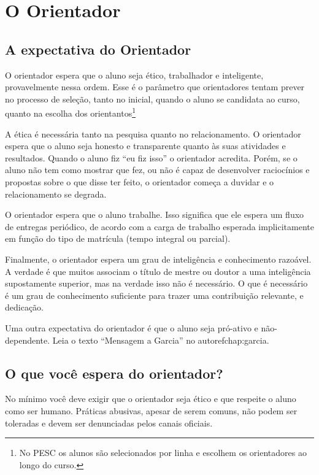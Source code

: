 \chapter{O Orientador}



\section{A expectativa do Orientador}

O orientador espera que o aluno seja ético, trabalhador e inteligente, provavelmente nessa ordem. Esse é o parâmetro que orientadores tentam prever no processo de seleção, tanto no inicial, quando o aluno se candidata ao curso, quanto na escolha dos orientantos\footnote{No PESC os alunos são selecionados por linha e escolhem os orientadores ao longo do curso.}

A ética é necessária tanto na pesquisa quanto no relacionamento. O orientador espera que o aluno seja honesto e transparente quanto às suas atividades e resultados. Quando o aluno fiz ``eu fiz isso'' o orientador acredita. Porém, se o aluno não tem como mostrar que fez, ou não é capaz de desenvolver raciocínios e propostas sobre o que disse ter feito, o orientador começa a duvidar e o relacionamento se degrada.

O orientador espera que o aluno trabalhe. Isso significa que ele espera um fluxo de entregas periódico, de acordo com a carga de trabalho esperada implicitamente em função do tipo de matrícula (tempo integral ou parcial). 

Finalmente, o orientador espera um grau de inteligência e conhecimento razoável. A verdade é que muitos associam o título de mestre ou doutor a uma inteligência  supostamente superior, mas na verdade isso não é necessário. O que é necessário é um grau de conhecimento suficiente para trazer uma contribuição relevante, e dedicação. 

Uma outra expectativa do orientador é que o aluno seja pró-ativo e não-dependente. Leia o texto ``Mensagem a Garcia'' no autoref{chap:garcia}.

\section{O que você espera do orientador?}

No mínimo você deve exigir que o orientador seja ético e que respeite o aluno como ser humano. Práticas abusivas, apesar de serem comuns, não podem ser toleradas e devem ser denunciadas pelos canais oficiais.

